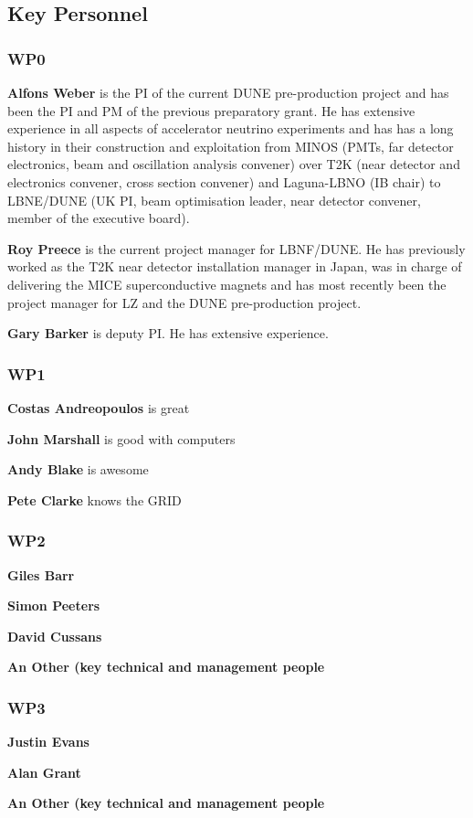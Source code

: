 \subsection{Key Personnel}
\subsubsection{WP0}

\noindent
{\bf Alfons Weber} is the PI of the current DUNE pre-production project and has been the PI and PM of the previous preparatory grant. He has extensive experience in all aspects of accelerator neutrino experiments and has has a long history in their construction and exploitation from MINOS (PMTs, far detector electronics, beam and oscillation analysis convener) over T2K (near detector and electronics convener, cross section convener) and Laguna-LBNO (IB chair) to LBNE/DUNE (UK PI, beam optimisation leader, near detector convener, member of the executive board).

\noindent
{\bf Roy Preece} is the current project manager for LBNF/DUNE. He has previously worked as the T2K near detector installation manager in Japan, was in charge of delivering the MICE superconductive magnets and has most recently been the project manager for LZ and the DUNE pre-production project. 


\noindent
{\bf Gary Barker} is deputy PI. He has extensive experience.

\subsubsection{WP1}

\noindent
{\bf Costas Andreopoulos} is great

\noindent
{\bf John Marshall} is good with computers

\noindent
{\bf Andy Blake} is awesome

\noindent
{\bf Pete Clarke} knows the GRID

\subsubsection{WP2}

\noindent
{\bf Giles Barr} 

\noindent
{\bf Simon Peeters} 

\noindent
{\bf David Cussans} 

\noindent
{\bf An Other (key technical and management people} 


\subsubsection{WP3}

\noindent
{\bf Justin Evans} 

\noindent
{\bf Alan Grant} 

\noindent
{\bf An Other (key technical and management people} 



